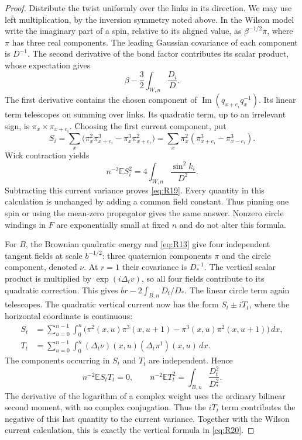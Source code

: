 \begin{proof}
Distribute the twist uniformly over the links in its direction. We may
use left multiplication, by the inversion symmetry noted above. In the
Wilson model write the imaginary part of a spin, relative to its aligned
value, as $\beta^{-1/2}\pi$, where $\pi$ has three real components. The
leading Gaussian covariance of each component is $D^{-1}$. The second
derivative of the bond factor contributes its scalar product, whose
expectation gives
\[
 \beta-\frac{3}{2}\int_{W,n}\frac{D_i}{D}.
\]
The first derivative contains the chosen component of
$\operatorname{Im}(q_{x+e_i}q_x^{-1})$. Its linear term telescopes on
summing over links. Its quadratic term, up to an irrelevant sign, is
$\pi_x\times\pi_{x+e_i}$. Choosing the first current component, put
\[
 S_i=\sum_x
       \bigl(\pi_x^2\pi_{x+e_i}^3-\pi_x^3\pi_{x+e_i}^2\bigr)
     =\sum_x\pi_x^2(\pi_{x+e_i}^3-\pi_{x-e_i}^3).
\]
Wick contraction yields
\[
 n^{-2}\mathbb E S_i^2
       =4\int_{W,n}\frac{\sin^2 k_i}{D^2}.
\]
Subtracting this current variance proves \eqref{eq:R19}. Every quantity
in this calculation is unchanged by adding a common field constant.
Thus pinning one spin or using the mean-zero propagator gives the same
answer. Nonzero circle windings in $F$ are exponentially small at fixed
$n$ and do not alter this formula.

For $B$, the Brownian quadratic energy and \eqref{eq:R13} give four
independent tangent fields at scale $b^{-1/2}$: three quaternion
components $\pi$ and the circle component, denoted $\nu$. At $r=1$ their
covariance is $D_*^{-1}$. The vertical scalar product is multiplied by
$\exp(i\Delta_t v)$, so all four fields contribute to its quadratic
correction. This gives $br-2\int_{B,n}D_t/D_*$. The linear circle term
again telescopes. The quadratic vertical current now has the form
$S_t\pm iT_t$, where the horizontal coordinate is continuous:
\[
 \begin{aligned}
 S_t&=\sum_{u=0}^{n-1}\int_0^n
    \bigl(\pi^2(x,u)\pi^3(x,u+1)
          -\pi^3(x,u)\pi^2(x,u+1)\bigr)\,dx,\\
 T_t&=\sum_{u=0}^{n-1}\int_0^n
         (\Delta_t\nu)(x,u)(\Delta_t\pi^1)(x,u)\,dx.
 \end{aligned}
\]
The components occurring in $S_t$ and $T_t$ are independent. Hence
\[
 n^{-2}\mathbb E S_tT_t=0,\qquad
 n^{-2}\mathbb E T_t^2=\int_{B,n}\frac{D_t^2}{D_*^2}.
\]
The derivative of the logarithm of a complex weight uses the ordinary
bilinear second moment, with no complex conjugation. Thus the $iT_t$
term contributes the negative of this last quantity to the current
variance. Together with the Wilson current calculation, this is exactly
the vertical formula in \eqref{eq:R20}.


\end{proof}
